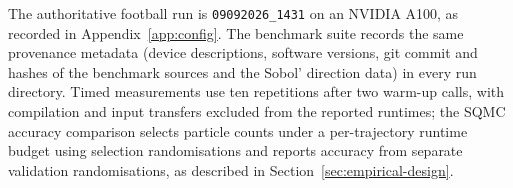 The authoritative football run is \texttt{09092026\_1431} on an NVIDIA A100, as recorded in Appendix~\ref{app:config}. The benchmark suite records the same provenance metadata (device descriptions, software versions, git commit and hashes of the benchmark sources and the Sobol' direction data) in every run directory. Timed measurements use ten repetitions after two warm-up calls, with compilation and input transfers excluded from the reported runtimes; the SQMC accuracy comparison selects particle counts under a per-trajectory runtime budget using selection randomisations and reports accuracy from separate validation randomisations, as described in Section~\ref{sec:empirical-design}.
